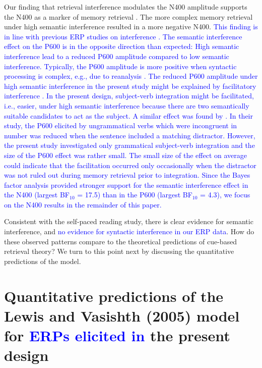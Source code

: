 \documentclass[a4paper, man, floatsintext]{apa7}
\begin{document}
Our finding that retrieval interference modulates the N400 amplitude supports the N400 as a marker of memory retrieval \citep{kutas&federmeier_2000, kutas_federmeier2011, brouwer2017_n4_p6, lau2008_n400}. The more complex memory retrieval under high semantic interference resulted in a more negative N400. \textcolor{blue}{This finding is in line with previous ERP studies on interference \citep{lee_garnsey, vasishth_drenhaus_2011, martinetal2014, schoknecht2022}. The semantic interference effect on the P600 is in the opposite direction than expected: High semantic interference lead to a reduced P600 amplitude compared to low semantic interference. Typically, the P600 amplitude is more positive when syntactic processing is complex, e.g., due to reanalysis \citep{osterhout&holcomb_1992}. The reduced P600 amplitude under high semantic interference in the present study might be explained by facilitatory interference \citep[see e.g.,][]{jaeger_etal_2017}. In the present design, subject-verb integration might be facilitated, i.e., easier, under high semantic interference because there are two semantically suitable candidates to act as the subject. A similar effect was found by \textcite{Tanner_etal_2017}. In their study, the P600 elicited by ungrammatical verbs which were incongruent in number was reduced when the sentence included a matching distractor. However, the present study investigated only grammatical subject-verb integration and the size of the P600 effect was rather small. The small size of the effect on average could indicate that the facilitation occurred only occasionally when the distractor was not ruled out during memory retrieval prior to integration. Since the Bayes factor analysis provided stronger support for the semantic interference effect in the N400 (largest BF$_{10}$ = 17.5) than in the P600 (largest BF$_{10}$ = 4.3), we focus on the N400 results in the remainder of this paper.}

Consistent with the self-paced reading study, there is clear evidence for semantic interference, and \textcolor{blue}{no evidence for syntactic interference in our ERP data}. How do these observed patterns compare to the theoretical predictions of cue-based retrieval theory? We turn to this point next by discussing the quantitative predictions of the \textcite{Lewis2005} model.

\section{Quantitative predictions of the Lewis and Vasishth (2005) model for \textcolor{blue}{ERPs elicited in} the present design}
\end{document}
